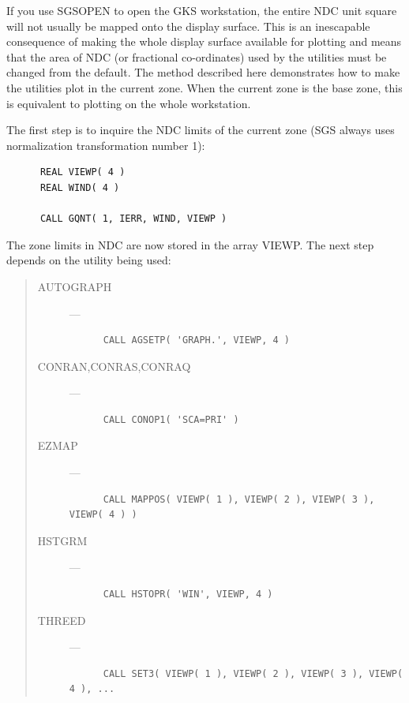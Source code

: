 \documentclass[twoside,11pt]{article}
\renewcommand{\_}{\texttt{\symbol{95}}}
\begin{document}
If you use SGS\_OPEN to open the GKS workstation, the entire NDC unit square
will not usually be mapped onto the display surface. 
This is an inescapable consequence of making the whole display surface
available for plotting and means that the area of NDC (or fractional
co-ordinates) used by the utilities must be changed from the default.
The method described here demonstrates how to make the utilities plot in the
current zone. 
When the current zone is the base zone, this is equivalent to plotting on the
whole workstation.

The first step is to inquire the NDC limits of the current zone (SGS always
uses normalization transformation number 1):

\begin{verbatim}
      REAL VIEWP( 4 )
      REAL WIND( 4 )

      CALL GQNT( 1, IERR, WIND, VIEWP )
\end{verbatim}

The zone limits in NDC are now stored in the array VIEWP.  The next
step depends on the utility being used:

\begin{quote}
\begin{description}
\item [AUTOGRAPH] ---
\begin{verbatim}
      CALL AGSETP( 'GRAPH.', VIEWP, 4 )
\end{verbatim}

\item [CONRAN,CONRAS,CONRAQ] ---
\begin{verbatim}
      CALL CONOP1( 'SCA=PRI' )
\end{verbatim}

\item [EZMAP] ---
\begin{verbatim}
      CALL MAPPOS( VIEWP( 1 ), VIEWP( 2 ), VIEWP( 3 ), VIEWP( 4 ) )
\end{verbatim}

\item [HSTGRM] ---
\begin{verbatim}
      CALL HSTOPR( 'WIN', VIEWP, 4 )
\end{verbatim}

\item [THREED] ---
\begin{verbatim}
      CALL SET3( VIEWP( 1 ), VIEWP( 2 ), VIEWP( 3 ), VIEWP( 4 ), ...
\end{verbatim}
\end{description}
\end{quote}
\end{document}

